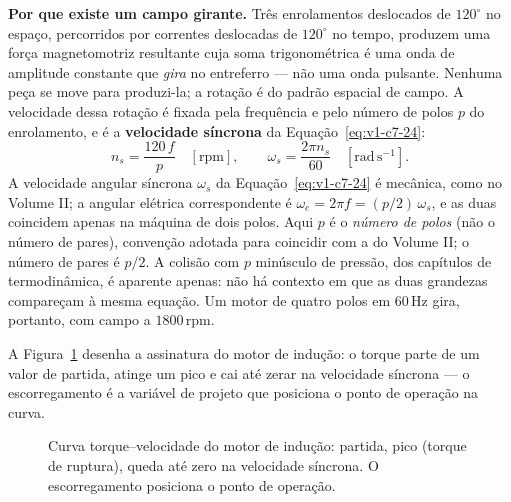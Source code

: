 \documentclass[12pt,a4paper]{article}
\numberwithin{equation}{section}
\numberwithin{table}{section}
\numberwithin{figure}{section}
\begin{document}
\textbf{Por que existe um campo girante.} Três enrolamentos deslocados de
$120^{\circ}$ no espaço, percorridos por correntes deslocadas de $120^{\circ}$
no tempo, produzem uma força magnetomotriz resultante cuja soma trigonométrica
é uma onda de amplitude constante que \emph{gira} no entreferro --- não uma
onda pulsante. Nenhuma peça se move para produzi-la; a rotação é do padrão
espacial de campo. A velocidade dessa rotação é fixada pela frequência e pelo
número de polos $p$ do enrolamento, e é a \textbf{velocidade síncrona} da
Equação~\eqref{eq:v1-c7-24}:
\begin{equation}\label{eq:v1-c7-24}
n_s = \frac{120\,f}{p} \quad [\mathrm{rpm}],
\qquad
\omega_s = \frac{2\pi n_s}{60} \quad [\mathrm{rad\,s^{-1}}] .
\end{equation}
A velocidade angular síncrona $\omega_s$ da Equação~\eqref{eq:v1-c7-24} é
mecânica, como no Volume II; a angular elétrica correspondente é
$\omega_e = 2\pi f = (p/2)\,\omega_s$, e as duas coincidem apenas na máquina de
dois polos. Aqui $p$ é o \emph{número de polos} (não o número de pares), convenção adotada
para coincidir com a do Volume II; o número de pares é $p/2$. A colisão com $p$
minúsculo de pressão, dos capítulos de termodinâmica, é aparente apenas: não há
contexto em que as duas grandezas compareçam à mesma equação. Um motor de
quatro polos em $60\,$Hz gira, portanto, com campo a $1800\,$rpm.

A Figura~\ref{fig:v1-c7-3} desenha a assinatura do motor de indução: o
torque parte de um valor de partida, atinge um pico e cai até zerar na
velocidade síncrona --- o escorregamento é a variável de projeto que posiciona
o ponto de operação na curva.

\begin{figure}[H]
\centering
{}
\caption[Curva torque--velocidade do motor de indução.]{Curva
torque--velocidade do motor de indução: partida, pico (torque de ruptura),
queda até zero na velocidade síncrona. O escorregamento posiciona o ponto
de operação.}
\label{fig:v1-c7-3}
\end{figure}
\end{document}
